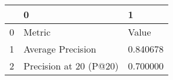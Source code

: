\begin{tabular}{lll}
\toprule
 & 0 & 1 \\
\midrule
0 & Metric & Value \\
1 & Average Precision & 0.840678 \\
2 & Precision at 20 (P@20) & 0.700000 \\
\bottomrule
\end{tabular}

